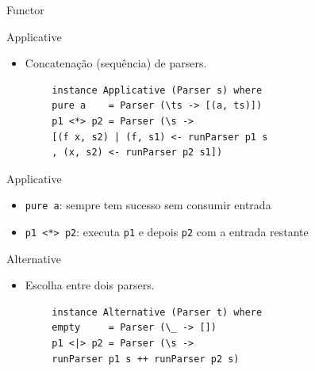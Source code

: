 \begin{frame}[fragile]{Functor}

\end{frame}

\begin{frame}[fragile]{Applicative}

    \begin{itemize}

        \item
        Concatenação (sequência) de parsers.
    \end{itemize}

    \begin{lstlisting}
        instance Applicative (Parser s) where
        pure a    = Parser (\ts -> [(a, ts)])
        p1 <*> p2 = Parser (\s ->
        [(f x, s2) | (f, s1) <- runParser p1 s
        , (x, s2) <- runParser p2 s1])
    \end{lstlisting}
\end{frame}

\begin{frame}[fragile]{Applicative}

    \begin{itemize}

        \item
        \texttt{pure a}: sempre tem sucesso sem consumir
        entrada
        \item
        \texttt{p1 <*> p2}: executa
        \texttt{p1} e depois \texttt{p2} com
        a entrada restante
    \end{itemize}
\end{frame}

\begin{frame}[fragile]{Alternative}

    \begin{itemize}

        \item
        Escolha entre dois parsers.
    \end{itemize}

    \begin{lstlisting}
        instance Alternative (Parser t) where
        empty     = Parser (\_ -> [])
        p1 <|> p2 = Parser (\s ->
        runParser p1 s ++ runParser p2 s)
    \end{lstlisting}
\end{frame}

